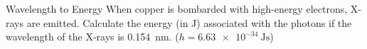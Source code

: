 \documentclass[handout,notes=hide]{beamer}
\begin{document}
\begin{frame}[t]{Wavelength to Energy}
	When copper is bombarded with high-energy electrons, X-rays are emitted.
	Calculate the energy (in \si{\joule}) associated with the photons if the
	wavelength of the X-rays is \SI{0.154}{\nano\meter}. ($h =
	\SI{6.63e-34}{\joule\second}$)

\end{frame}

\end{document}
